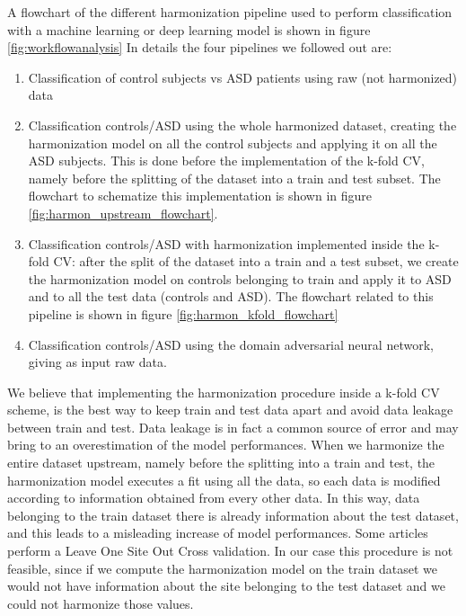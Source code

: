 \documentclass[11pt]{report}
\begin{document}
A flowchart of the different harmonization pipeline used to perform classification with a machine learning or deep learning model is shown in figure \ref{fig:workflowanalysis}
In details the four pipelines we followed out are:
\begin{enumerate}
\item Classification of control subjects vs ASD patients using raw (not harmonized) data
\item Classification controls/ASD using the whole harmonized dataset, creating the harmonization model on all the control subjects and applying it on all the ASD subjects. This is done before the implementation of the k-fold CV, namely before the splitting of the dataset into a train and test subset. The flowchart to schematize this implementation is shown in figure \ref{fig:harmon_upstream_flowchart}.
\item Classification controls/ASD with harmonization implemented inside the k-fold CV: after the split of the dataset into a train and a test subset, we create the harmonization model on controls belonging to train and apply it to ASD and to all the test data (controls and ASD). The flowchart related to this pipeline is shown in figure \ref{fig:harmon_kfold_flowchart}
\item Classification controls/ASD using the domain adversarial neural network, giving as input raw data.
\end{enumerate}


We believe that implementing the harmonization procedure inside a k-fold CV scheme, is the best way to keep train and test data apart and avoid data leakage between train and test.
Data leakage is in fact a common source of error and may bring to an overestimation of the model performances.
When we harmonize the entire dataset upstream, namely before the splitting into a train and test, the harmonization model executes a fit using all the data, so each data is modified according to information obtained from every other data.
In this way, data belonging to the train dataset there is already information about the test dataset, and this leads to a misleading increase of model performances.
Some articles perform a Leave One Site Out Cross validation.
In our case this procedure is not feasible, since if we compute the harmonization model on the train dataset we would not have information about the site belonging to the test dataset and we could not harmonize those values.
\end{document}
